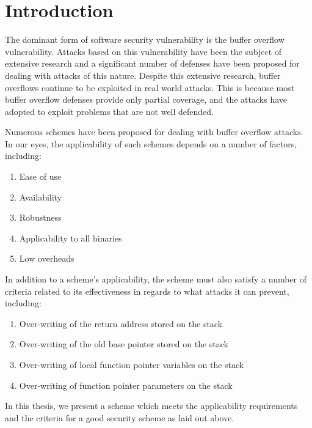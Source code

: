 
\renewcommand{\thechapter}{1}

\chapter{Introduction}

The dominant form of software security vulnerability is the buffer overflow vulnerability. Attacks
based on this vulnerability have been the subject of extensive research and a significant number of
defenses have been proposed for dealing with attacks of this nature. Despite this extensive
research, buffer overflows continue to be exploited in real world attacks. This is because most
buffer overflow defenses provide only partial coverage, and the attacks have adopted to exploit
problems that are not well defended.

Numerous schemes have been proposed for dealing with buffer overflow attacks. In our eyes, the
applicability of such schemes depends on a number of factors, including:

\begin{enumerate}
 \item Ease of use
 \item Availability
 \item Robustness
 \item Applicability to all binaries
 \item Low overheads
\end{enumerate}

In addition to a scheme's applicability, the scheme must also satisfy a number of criteria related
to its effectiveness in regards to what attacks it can prevent, including:

\begin{enumerate}
 \item Over-writing of the return address stored on the stack
 \item Over-writing of the old base pointer stored on the stack
 \item Over-writing of local function pointer variables on the stack
 \item Over-writing of function pointer parameters on the stack
\end{enumerate}

In this thesis, we present a scheme which meets the applicability requirements and the criteria for
a good security scheme as laid out above. 

